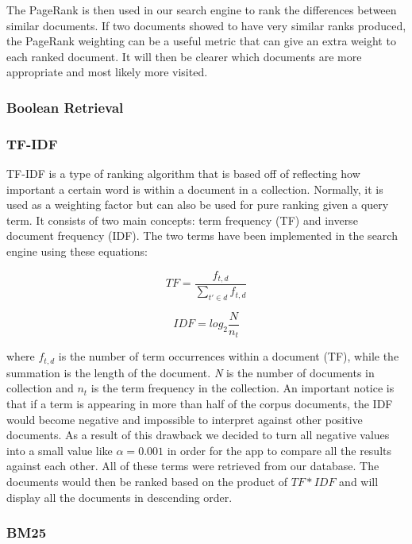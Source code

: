 The PageRank is then used in our search engine to rank the differences between similar documents. If two documents showed to have very similar ranks produced, the PageRank weighting can be a useful metric that can give an extra weight to each ranked document. It will then be clearer which documents are more appropriate and most likely more visited. 



\subsubsection{Boolean Retrieval} %
\label{ssub:boolean_retrieval}


\subsubsection{TF-IDF} %
\label{sub:tf_idf}

TF-IDF is a type of ranking algorithm that is based off of reflecting how important a certain word is within a document in a collection. Normally, it is used as a weighting factor but can also be used for pure ranking given a query term. It consists of two main concepts:  term frequency (TF) and inverse document frequency (IDF). The two terms have been implemented in the search engine using these equations:

$$TF = \frac{f_{t,d}}{\sum\limits_{t' \in d} f_{t,d}}$$

$$IDF = log_2 \frac{N}{n_t}$$

where $f_{t,d}$ is the number of term occurrences within a document (TF), while the summation is the length of the document. \emph{N} is the number of documents in collection and $n_t$ is the term frequency in the collection. An important notice is that if a term is appearing in more than half of the corpus documents, the IDF would become negative and impossible to interpret against other positive documents. As a result of this drawback we decided to turn all negative values into a small value like $\alpha = 0.001$ in order for the app to compare all the results against each other. All of these terms were retrieved from our database. The documents would then be ranked based on the product of $TF * IDF$ and will display all the documents in descending order. 


\subsubsection{BM25} %
\label{ssub:BM25}

